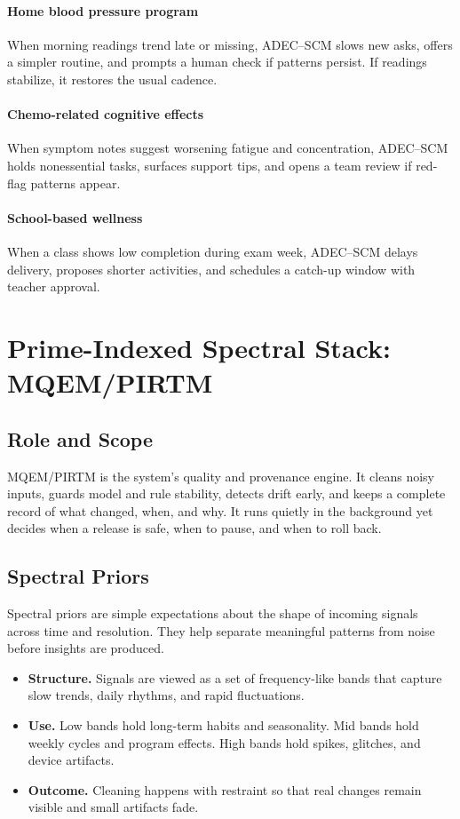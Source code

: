\documentclass[12pt]{article}
\begin{document}
\paragraph{Home blood pressure program}
When morning readings trend late or missing, ADEC–SCM slows new asks, offers a simpler routine, and prompts a human check if patterns persist. If readings stabilize, it restores the usual cadence.

\paragraph{Chemo-related cognitive effects}
When symptom notes suggest worsening fatigue and concentration, ADEC–SCM holds nonessential tasks, surfaces support tips, and opens a team review if red-flag patterns appear.

\paragraph{School-based wellness}
When a class shows low completion during exam week, ADEC–SCM delays delivery, proposes shorter activities, and schedules a catch-up window with teacher approval.


\section{Prime-Indexed Spectral Stack: MQEM/PIRTM}

\subsection*{Role and Scope}
MQEM/PIRTM is the system’s quality and provenance engine. It cleans noisy inputs, guards model and rule stability, detects drift early, and keeps a complete record of what changed, when, and why. It runs quietly in the background yet decides when a release is safe, when to pause, and when to roll back.

\subsection*{Spectral Priors}
Spectral priors are simple expectations about the shape of incoming signals across time and resolution. They help separate meaningful patterns from noise before insights are produced.
\begin{itemize}[leftmargin=*]
  \item \textbf{Structure.} Signals are viewed as a set of frequency-like bands that capture slow trends, daily rhythms, and rapid fluctuations.
  \item \textbf{Use.} Low bands hold long-term habits and seasonality. Mid bands hold weekly cycles and program effects. High bands hold spikes, glitches, and device artifacts.
  \item \textbf{Outcome.} Cleaning happens with restraint so that real changes remain visible and small artifacts fade.
\end{itemize}
\end{document}
